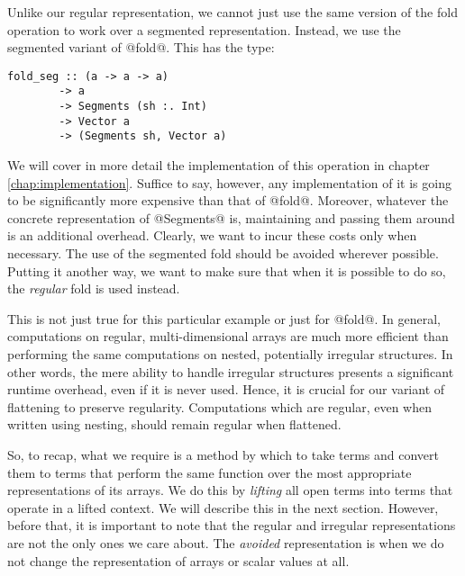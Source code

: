 Unlike our regular representation, we cannot just use the same version of the fold operation to work over a segmented representation. Instead, we use the segmented variant of @fold@. This has the type:
%
\begin{lstlisting}[style=ndp]
fold_seg :: (a -> a -> a)
        -> a
        -> Segments (sh :. Int)
        -> Vector a
        -> (Segments sh, Vector a)
\end{lstlisting}
%
We will cover in more detail the implementation of this operation in chapter \ref{chap:implementation}. Suffice to say, however, any implementation of it is going to be significantly more expensive than that of @fold@. Moreover, whatever the concrete representation of @Segments@ is, maintaining and passing them around is an additional overhead. Clearly, we want to incur these costs only when necessary. The use of the segmented fold should be avoided wherever possible. Putting it another way, we want to make sure that when it is possible to do so, the \emph{regular} fold is used instead.

This is not just true for this particular example or just for @fold@. In general, computations on regular, multi-dimensional arrays are much more efficient than performing the same computations on nested, potentially irregular structures. In other words, the mere ability to handle irregular structures presents a significant runtime overhead, even if it is never used. Hence, it is crucial for our variant of flattening to preserve regularity. Computations which are regular, even when written using nesting, should remain regular when flattened.

So, to recap, what we require is a method by which to take \ndp{} terms and convert them to terms that perform the same function over the most appropriate representations of its arrays. We do this by \emph{lifting} all open terms into terms that operate in a lifted context. We will describe this in the next section. However, before that, it is important to note that the regular and irregular representations are not the only ones we care about. The \emph{avoided} representation is when we do not change the representation of arrays or scalar values at all.

